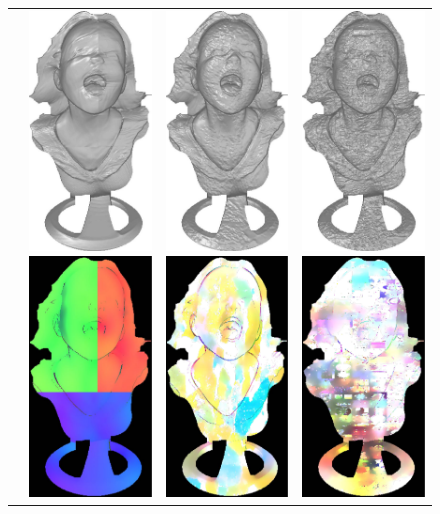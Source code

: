 \begin{figure}[H]
{\begin{tabular}{cccc}
\multirow{-15}{*}{\parbox[t]{2.5mm}{}} &
 \includegraphics[height=0.25\linewidth]{figures/result/comp_fusion_rgbN_shape.pdf}
 \includegraphics[height=0.25\linewidth]{figures/result/comp_fusion_rgbN_albedo.pdf} &
 \includegraphics[height=0.25\linewidth]{figures/result/comp_fusion_patternN_shape.pdf} 
\includegraphics[height=0.25\linewidth]{figures/result/comp_fusion_patternN_albedo.pdf} &
\includegraphics[height=0.25\linewidth]{figures/result/comp_fusion_loveN_shape.pdf} 
\includegraphics[height=0.25\linewidth]{figures/result/comp_fusion_loveN_albedo.pdf} \\

\end{tabular}}
\end{figure}
